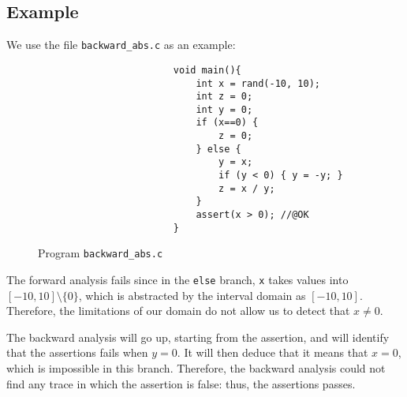 \documentclass[12pt,a4paper]{article}
\begin{document}
\subsection{Example}
We use the file \texttt{backward\_abs.c} as an example:
\begin{figure}[H]
    \centering
    \begin{verbatim}
                        void main(){
                            int x = rand(-10, 10);
                            int z = 0;
                            int y = 0;
                            if (x==0) {
                                z = 0;
                            } else {
                                y = x;
                                if (y < 0) { y = -y; }
                                z = x / y;
                            }
                            assert(x > 0); //@OK
                        }
    \end{verbatim}
    \caption{Program \texttt{backward\_abs.c}}
\end{figure}
The forward analysis fails since in the \texttt{else} branch, \texttt{x} takes values into $[-10, 10]\setminus\{0\}$, which is abstracted by the interval domain as $[-10, 10]$. Therefore, the limitations of our domain do not allow us to detect that $x\neq 0$.

The backward analysis will go up, starting from the assertion, and will identify that the assertions fails when $y=0$. It will then deduce that it means that $x=0$, which is impossible in this branch. Therefore, the backward analysis could not find any trace in which the assertion is false: thus, the assertions passes.
\end{document}
